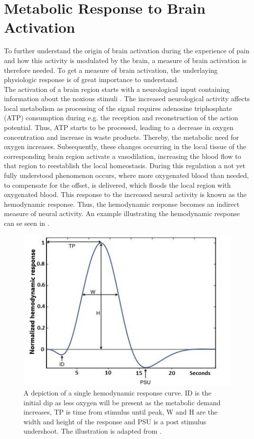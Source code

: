 
\section{Metabolic Response to Brain Activation} \label{sec:pain}

To further understand the origin of brain activation during the experience of pain and how this activity is modulated by the brain, a measure of brain activation is therefore needed. To get a measure of brain activation, the underlaying physiologic response is of great importance to understand. \\
The activation of a brain region starts with a neurological input containing information about the noxious stimuli \cite{Tracey2007}. The increased neurological activity affects local metabolism as processing of the signal requires adenosine triphosphate (ATP) consumption during e.g. the reception and reconstruction of the action potential. Thus, ATP starts to be processed, leading to a decrease in oxygen concentration and increase in waste products. Thereby, the metabolic need for oxygen increases. Subsequently, these changes occurring in the local tissue of the corresponding brain region activate a vasodilation, increasing the blood flow to that region to reestablish the local homeostasis. During this regulation a not yet fully understood phenomenon occurs, where more oxygenated blood than needed, to compensate for the offset, is delivered, which floods the local region with oxygenated blood. This response to the increased neural activity is known as the hemodynamic response. Thus, the hemodynamic response becomes an indirect measure of neural activity. \cite{Glover2011,Poldrack2011}  %
An example illustrating the hemodynamic response can se seen in .

\begin{figure}[H]                 
	\includegraphics[width=.62\textwidth]{figures/aBackground/HRF}  
	\caption{A depiction of a single hemodynamic response curve. ID is the initial dip as less oxygen will be present as the metabolic demand increases, TP is time from stimulus until peak, W and H are the width and height of the response and PSU is a post stimulus undershoot. The illustration is adapted from \cite{Poldrack2011}.}
	\label{fig:back:HRF} 
\end{figure}

